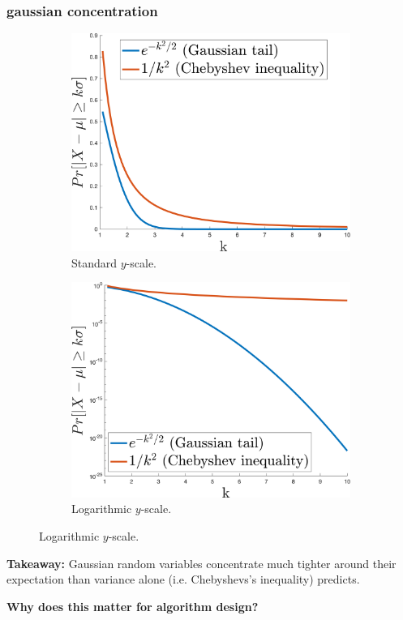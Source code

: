\documentclass[compress]{beamer}
\begin{document}
\begin{frame}
	\frametitle{gaussian concentration}
	\begin{figure}
		\begin{subfigure}[t]{0.47\textwidth}
			\centering
			\includegraphics[width=\textwidth]{standardScale.png}
			\caption{Standard $y$-scale.}
		\end{subfigure}
		\hspace{.5em}
		\begin{subfigure}[t]{0.47\textwidth}
			\centering
			\includegraphics[width=\textwidth]{logScale.png}
			\caption{Logarithmic $y$-scale.}
		\end{subfigure}
	\end{figure}
	\textbf{Takeaway:} Gaussian random variables concentrate much tighter around their expectation than variance alone (i.e. Chebyshevs's inequality)  predicts.

\begin{center}
	\alert{\textbf{Why does this matter for algorithm design?}}
\end{center}
\end{frame}
\end{document}
